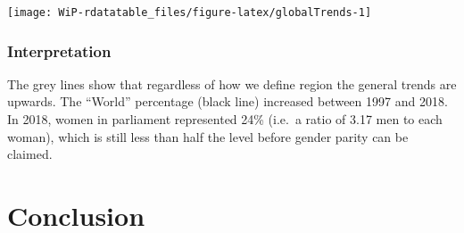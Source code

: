 \documentclass[a4paper,9pt,twocolumn,twoside,printwatermark=false]{pinp}
\begin{document}
\begin{Shaded}
\end{Shaded}

\begin{center}\texttt{[image: WiP-rdatatable\_files/figure-latex/globalTrends-1]} \end{center}

\subsubsection{Interpretation}\label{interpretation-5}

The grey lines show that regardless of how we define region the general
trends are upwards. The ``World'' percentage (black line) increased
between 1997 and 2018. In 2018, women in parliament represented 24\%
(i.e.~a ratio of 3.17 men to each woman), which is still less than half
the level before gender parity can be claimed.

\section{Conclusion}\label{conclusion}
\end{document}
